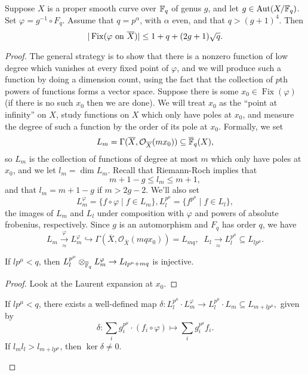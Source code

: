 \documentclass[letterpaper,11pt]{article}
\DeclareMathOperator{\Aut}{Aut}
\DeclareMathOperator{\Fix}{Fix}
\begin{document}
\begin{thm} Suppose $X$ is a proper smooth curve over $\mathbb{F}_q$ of genus $g$, and let $g \in \Aut(X/\FF_q)$. Set $\varphi = g^{-1}\circ F_q$. Assume that $q = p^\alpha$, with $\alpha$ even, and that $q > (g+1)^4$. Then
\[
|\Fix(\varphi \text{\rm{ on }}\overline{X})| \le 1 + q + (2g+1)\sqrt{q}.
\]
\end{thm}
\begin{proof} The general strategy is to show that there is a nonzero function of low degree which vanishes at every fixed point of $\varphi$, and we will produce such a function by doing a dimension count, using the fact that the collection of $p$th powers of functions forms a vector space. Suppose there is some $x_0 \in \Fix(\varphi)$ (if there is no such $x_0$ then we are done). We will treat $x_0$ as the ``point at infinity'' on $X$, study functions on $X$ which only have poles at $x_0$, and measure the degree of such a function by the order of its pole at $x_0$. Formally, we set
\[
L_m = \Gamma(\overline{X},\mathcal{O}_{\overline{X}}(mx_0)) \subseteq \overline{\mathbb{F}}_q(X),
\]
so $L_m$ is the collection of functions of degree at most $m$ which only have poles at $x_0$, and we let $l_m = \dim L_m$. Recall that Riemann-Roch implies that
\[
m+1-g \le l_m \le m+1,
\]
and that $l_m = m+1-g$ if $m > 2g-2$. We'll also set
\[
L_m^{\varphi} = \{f\circ \varphi \mid f \in L_m\}, L_l^{p^{\mu}} = \{f^{p^{\mu}} \mid f \in L_l\},
\]
the images of $L_m$ and $L_l$ under composition with $\varphi$ and powers of absolute frobenius, respectively. Since $g$ is an automorphism and $F_q$ has order $q$, we have
\[
L_m \xrightarrow[\approx]{\varphi} L_m^{\varphi} \hookrightarrow \Gamma(\overline{X},\mathcal{O}_{\overline{X}}(mqx_0)) = L_{mq},\;\; L_l \xrightarrow[\approx]{} L_l^{p^{\mu}} \subseteq L_{lp^{\mu}}.
\]

\begin{lem} If $lp^{\mu} < q$, then $L_l^{p^{\mu}}\otimes_{\overline{\mathbb{F}}_q} L_m^{\varphi} \rightarrow L_{lp^{\mu}+mq}$ is injective.
\end{lem}
\begin{proof} Look at the Laurent expansion at $x_0$.
\end{proof}

\begin{cor} If $lp^{\mu} < q$, there exists a well-defined map $\delta: L_l^{p^{\mu}}\cdot L_m^{\varphi} \rightarrow L_l^{p^{\mu}}\cdot L_m \subseteq L_{m+lp^{\mu}},$ given by
\[
\delta : \sum_i g_i^{p^{\mu}}\cdot (f_i\circ \varphi) \mapsto \sum_i g_i^{p^{\mu}}f_i.
\]
If $l_ml_l > l_{m+lp^{\mu}}$, then $\ker \delta \ne 0$.
\end{cor}


\end{proof}
\end{document}
